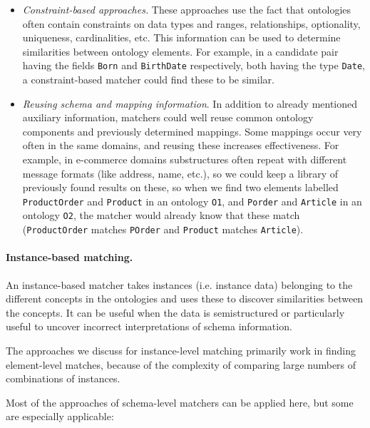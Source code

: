 \documentclass{fast_latex}
\begin{document}
\begin{itemize}
\item \textit{Constraint-based approaches.} These approaches use the
fact that ontologies often contain constraints on data types and
ranges, relationships, optionality, uniqueness, cardinalities, etc.
This information can be used to determine similarities between ontology
elements. For example, in a candidate pair having the fields
\texttt{Born} and \texttt{BirthDate}
respectively, both having the type \texttt{Date}, a
constraint-based matcher could find these to be similar. 
\end{itemize}
\begin{itemize}
\item \textit{Reusing schema and mapping information}. In addition to
already mentioned auxiliary information, matchers could well reuse
common ontology components and previously determined mappings. Some
mappings occur very often in the same domains, and reusing these
increases effectiveness. For example, in e-commerce domains
substructures often repeat with different message formats (like
address, name, etc.), so we could keep a library of previously found
results on these, so when we find two elements labelled
\texttt{ProductOrder} and \texttt{Product} in
an ontology \texttt{O1}, and \texttt{Porder}
and \texttt{Article} in an ontology
\texttt{O2}, the matcher would already know that these
match (\texttt{ProductOrder} matches
\texttt{POrder} and \texttt{Product} matches
\texttt{Article}). 
\end{itemize}

\paragraph{Instance-based matching.}
An instance-based matcher \cite{rahm01survey} takes instances
(i.e. instance data) belonging to the different concepts in the
ontologies and uses these to discover similarities between the
concepts. It can be useful when the data is semistructured or
particularly useful to uncover incorrect interpretations of schema
information. 

The approaches we discuss for instance-level matching primarily work in
finding element-level matches, because of the complexity of comparing
large numbers of combinations of instances. 

Most of the approaches of schema-level matchers can be applied here, but
some are especially applicable: 
\end{document}
